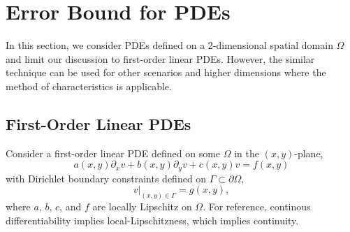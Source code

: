 \documentclass[accepted]{uai2023}
\begin{document}
\section{Error Bound for PDEs}
    In this section, we consider PDEs defined on a 2-dimensional spatial domain $\Omega$ and limit our discussion to first-order linear PDEs. 
    However, the similar technique can be used for other scenarios and higher dimensions where the method of characteristics is applicable.

\subsection{First-Order Linear PDEs}
    Consider a first-order linear PDE defined on some $\Omega$ in the $(x, y)$-plane,
    {
        \small
        \begin{equation}\label{eq:pde-master}
            a(x, y) \partial_x v + b(x, y) \partial_y v + c(x, y)v = f(x, y)
        \end{equation}
    }
    with Dirichlet boundary constraints defined on $\Gamma \subset \partial \Omega$,
    {
        \small
        \begin{equation}\label{eq:pde-bc-master}
            v\Big|_{(x, y) \in \Gamma} = g(x, y),
        \end{equation}
    }
    where $a$, $b$, $c$, and $f$ are locally Lipschitz on $\Omega$. For reference, continous differentiability implies local-Lipschitzness, which implies continuity.
\end{document}
